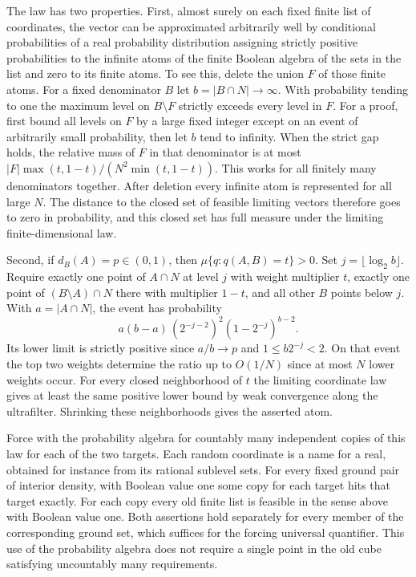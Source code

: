 \documentclass[11pt]{article}
\begin{document}
The law has two properties. First, almost surely on each fixed finite list of coordinates, the vector can be approximated arbitrarily well by conditional probabilities of a real probability distribution assigning strictly positive probabilities to the infinite atoms of the finite Boolean algebra of the sets in the list and zero to its finite atoms. To see this, delete the union \(F\) of those finite atoms. For a fixed denominator \(B\) let \(b=|B\cap N|\to\infty\). With probability tending to one the maximum level on \(B\setminus F\) strictly exceeds every level in \(F\). For a proof, first bound all levels on \(F\) by a large fixed integer except on an event of arbitrarily small probability, then let \(b\) tend to infinity. When the strict gap holds, the relative mass of \(F\) in that denominator is at most \(|F|\max(t,1-t)/(N^2\min(t,1-t))\). This works for all finitely many denominators together. After deletion every infinite atom is represented for all large \(N\). The distance to the closed set of feasible limiting vectors therefore goes to zero in probability, and this closed set has full measure under the limiting finite-dimensional law.

Second, if \(d_B(A)=p\in(0,1)\), then \(\mu\{q:q(A,B)=t\}>0\). Set \(j=\lfloor\log_2 b\rfloor\). Require exactly one point of \(A\cap N\) at level \(j\) with weight multiplier \(t\), exactly one point of \((B\setminus A)\cap N\) there with multiplier \(1-t\), and all other \(B\) points below \(j\). With \(a=|A\cap N|\), the event has probability \[a(b-a)\,(2^{-j-2})^2(1-2^{-j})^{b-2}.\] Its lower limit is strictly positive since \(a/b\to p\) and \(1\le b2^{-j}<2\). On that event the top two weights determine the ratio up to \(O(1/N)\) since at most \(N\) lower weights occur. For every closed neighborhood of \(t\) the limiting coordinate law gives at least the same positive lower bound by weak convergence along the ultrafilter. Shrinking these neighborhoods gives the asserted atom.

Force with the probability algebra for countably many independent copies of this law for each of the two targets. Each random coordinate is a name for a real, obtained for instance from its rational sublevel sets. For every fixed ground pair of interior density, with Boolean value one some copy for each target hits that target exactly. For each copy every old finite list is feasible in the sense above with Boolean value one. Both assertions hold separately for every member of the corresponding ground set, which suffices for the forcing universal quantifier. This use of the probability algebra does not require a single point in the old cube satisfying uncountably many requirements.
\end{document}
